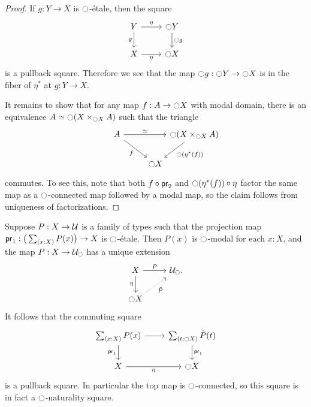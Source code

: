\documentclass[9pt,twosided]{amsart}
\begin{document}
\begin{proof}
If $g:Y\to X$ is ${\ocircle}$-\'etale, then the square
\begin{equation*}
\begin{tikzcd}
Y \arrow[d,swap,"g"] \arrow[r,"\modalunit"] & \modal Y \arrow[d,"\modal g"] \\
X \arrow[r,swap,"\modalunit"] & \modal X
\end{tikzcd}
\end{equation*}
is a pullback square. Therefore we see that the map ${\ocircle} g : {\ocircle} Y \to {\ensuremath{\ocircle}} X$ is in the fiber of $\eta^\ast$ at $g : Y\to X$. 

It remains to show that for any map $f:A\to{\ensuremath{\ocircle}} X$ with modal domain, there is an equivalence $\eqv{A}{\modal (X\times_{\modal X} A)}$ such that the triangle
\begin{equation*}
\begin{tikzcd}[column sep=0]
A \arrow[dr,swap,"f"] \arrow[rr,"\eqvsym"] & & \modal (X\times_{\modal X} A) \arrow[dl,"\modal(\eta^\ast(f))"] \\
\phantom{\modal (X\times_{\modal X} A)} & \modal X
\end{tikzcd}
\end{equation*}
commutes. To see this, note that both $f\circ \mathsf{pr}_{2}$ and ${\ocircle}(\eta^\ast(f))\circ {\eta_{}}$ factor the same map as a ${\ocircle}$-connected map followed by a modal map, so the claim follows from uniqueness of factorizations.
\end{proof}

\begin{cor}
Suppose $P:X\to\mathcal{U}$ is a family of types such that the projection map $\proj 1:\big(\sm{x:X}P(x)\big)\to X$ is ${\ocircle}$-\'etale. Then $P(x)$ is ${\ocircle}$-modal for each $x:X$, and the map $P:X\to\mathcal{U}_{\ocircle}$ has a unique extension
\begin{equation*}
\begin{tikzcd}
X \arrow[d,swap,"\modalunit"] \arrow[r,"P"] & \UU_\modal. \\
\modal X \arrow[ur,densely dotted,swap,"\tilde{P}"] 
\end{tikzcd}
\end{equation*}
It follows that the commuting square
\begin{equation*}
\begin{tikzcd}
\sm{x:X}P(x) \arrow[d,swap,"\proj 1"] \arrow[r] & \sm{t:\modal X}\tilde{P}(t) \arrow[d,"\proj 1"] \\
X \arrow[r,swap,"\modalunit"] & \modal X
\end{tikzcd}
\end{equation*}
is a pullback square. In particular the top map is ${\ocircle}$-connected, so this square is in fact a ${\ocircle}$-naturality square.
\end{cor}
\end{document}
